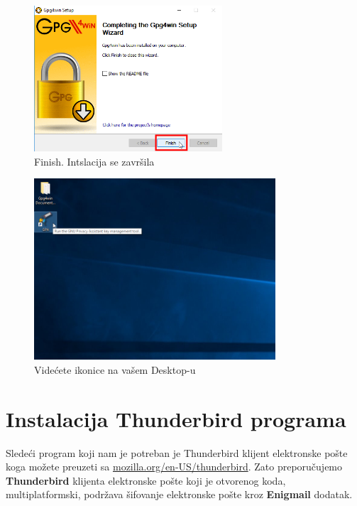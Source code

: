 \documentclass[a4paper,11pt]{article}
\begin{document}
\newpage
\begin{figure}[!h]
	\begin{center}
		\includegraphics[width=7cm]{15_Gpg4win_Setup.png}
		\caption{Finish. Intslacija se zavr\v{s}ila}
		\label{initialscreen}
	\end{center}
\end{figure}
\begin{figure}[!h]
	\begin{center}
		\includegraphics[width=9cm]{16_Desktop.png}
		\caption{Vide\'{c}ete ikonice na va\v{s}em Desktop-u}
		\label{initialscreen}
	\end{center}
\end{figure}
\newpage

\section{Instalacija Thunderbird programa}
Slede\'{c}i program koji nam je potreban je Thunderbird klijent elektronske po\v{s}te koga mo\v{z}ete preuzeti sa \href{https://www.mozilla.org/en-US/thunderbird/}{mozilla.org/en-US/thunderbird}.
\newline Zato preporu\v{c}ujemo \textbf{Thunderbird} klijenta elektronske po\v{s}te koji je otvorenog koda, multiplatformski, podr\v{z}ava \v{s}ifovanje elektronske po\v{s}te kroz \textbf{Enigmail} dodatak.
\end{document}
